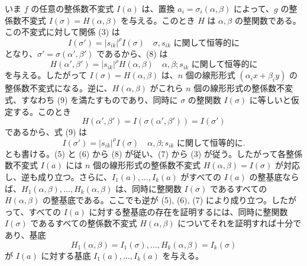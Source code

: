 いま \(f\) の任意の整係数不変式 \(I(a)\) は、置換 \(a_i=\sigma_i(\alpha,\beta)\) によって、\(g\) の整係数不変式 \(I(\sigma)=H(\alpha,\beta)\) を与える。このとき \(H\) は \(\alpha,\beta\) の整関数である。この不変式に対して関係 (3) は
\begin{equation}
        I(\sigma')=|s_{ik}|^\rho I(\sigma)
        \quad \text{\(\sigma,s_{ik}\) に関して恒等的に}
\end{equation}
となり、\(\sigma'=\sigma(\alpha',\beta')\) であるから、(8) は
\begin{equation}
        H(\alpha',\beta')=|s_{ik}|^\rho H(\alpha,\beta)
        \quad \text{\(\alpha,\beta;s_{ik}\) に関して恒等的に}
\end{equation}
を与える。したがって \(I(\sigma)=H(\alpha,\beta)\) は、\(n\) 個の線形形式 \((\alpha_i x+\beta_i y)\) の整係数不変式になる。逆に、\(H(\alpha,\beta)\) がこれら \(n\) 個の線形形式の整係数不変式、すなわち (9) を満たすものであり、同時に \(\sigma\) の整関数 \(I(\sigma)\) に等しいと仮定する。このとき
\[
        H(\alpha',\beta')=I(\sigma(\alpha',\beta'))=I(\sigma')
\]
であるから、式 (9) は
\begin{equation*}
        I(\sigma')=|s_{ik}|^\rho I(\sigma)
        \quad \text{\(\alpha,\beta;s_{ik}\) に関して恒等的に}.\tag{9a}
\end{equation*}
とも書ける。(5) と (6) から (8) が従い、(7) から (3) が従う。したがって各整係数不変式 \(I(a)\) には \(n\) 個の線形形式の整係数不変式 \(H(\alpha,\beta)=I(\sigma)\) が対応し、逆も成り立つ。さらに、\(I_1(a),\ldots,I_k(a)\) がすべての \(I(a)\) の整基底ならば、\(H_1(\alpha,\beta),\ldots,H_k(\alpha,\beta)\) は、同時に整関数 \(I(\sigma)\) であるすべての \(H(\alpha,\beta)\) の整基底である。ここでも逆が (5), (6), (7) により成り立つ。したがって、すべての \(I(a)\) に対する整基底の存在を証明するには、同時に整関数 \(I(\sigma)\) であるすべての整係数不変式 \(H(\alpha,\beta)\) についてそれを証明すれば十分であり、基底
\[
        H_1(\alpha,\beta)=I_1(\sigma),\ldots,H_k(\alpha,\beta)=I_k(\sigma)
\]
が \(I(a)\) に対する基底 \(I_1(a),\ldots,I_k(a)\) を与える。


